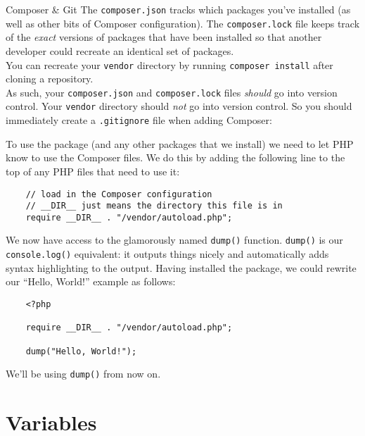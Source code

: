 \begin{infobox}{Composer \& Git}
    The \texttt{composer.json} tracks which packages you've installed (as well as other bits of Composer configuration). The \texttt{composer.lock} file keeps track of the \textit{exact} versions of packages that have been installed so that another developer could recreate an identical set of packages.
    \\

    You can recreate your \texttt{vendor} directory by running \texttt{composer install} after cloning a repository.
    \\

    As such, your \texttt{composer.json} and \texttt{composer.lock} files \textit{should} go into version control. Your \texttt{vendor} directory should \textit{not} go into version control. So you should immediately create a \texttt{.gitignore} file when adding Composer:


\end{infobox}

To use the package (and any other packages that we install) we need to let PHP know to use the Composer files. We do this by adding the following line to the top of any PHP files that need to use it:

\begin{verbatim}
    // load in the Composer configuration
    // __DIR__ just means the directory this file is in
    require __DIR__ . "/vendor/autoload.php";
\end{verbatim}

We now have access to the glamorously named \texttt{dump()} function. \texttt{dump()} is our \texttt{console.log()} equivalent: it outputs things nicely and automatically adds syntax highlighting to the output. Having installed the package, we could rewrite our ``Hello, World!'' example as follows:

\begin{verbatim}
    <?php

    require __DIR__ . "/vendor/autoload.php";

    dump("Hello, World!");
\end{verbatim}

We'll be using \texttt{dump()} from now on.


\section{Variables}

